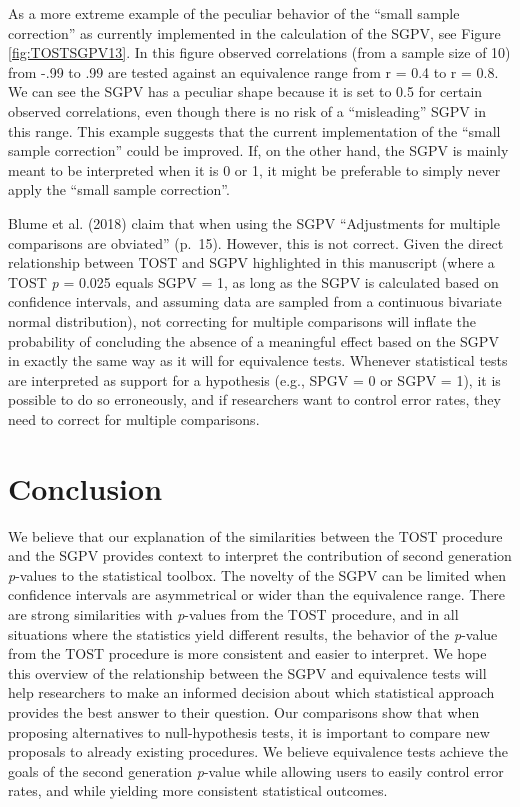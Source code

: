 \documentclass[,man,floatsintext]{apa6}
\begin{document}
As a more extreme example of the peculiar behavior of the \enquote{small sample correction} as currently implemented in the calculation of the SGPV, see Figure \ref{fig:TOSTSGPV13}. In this figure observed correlations (from a sample size of 10) from -.99 to .99 are tested against an equivalence range from r = 0.4 to r = 0.8. We can see the SGPV has a peculiar shape because it is set to 0.5 for certain observed correlations, even though there is no risk of a \enquote{misleading} SGPV in this range. This example suggests that the current implementation of the \enquote{small sample correction} could be improved. If, on the other hand, the SGPV is mainly meant to be interpreted when it is 0 or 1, it might be preferable to simply never apply the \enquote{small sample correction}.

Blume et al. (2018) claim that when using the SGPV \enquote{Adjustments for multiple comparisons are obviated} (p.~15). However, this is not correct. Given the direct relationship between TOST and SGPV highlighted in this manuscript (where a TOST \emph{p} = 0.025 equals SGPV = 1, as long as the SGPV is calculated based on confidence intervals, and assuming data are sampled from a continuous bivariate normal distribution), not correcting for multiple comparisons will inflate the probability of concluding the absence of a meaningful effect based on the SGPV in exactly the same way as it will for equivalence tests. Whenever statistical tests are interpreted as support for a hypothesis (e.g., SPGV = 0 or SGPV = 1), it is possible to do so erroneously, and if researchers want to control error rates, they need to correct for multiple comparisons.

\hypertarget{conclusion}{%
\section{Conclusion}\label{conclusion}}

We believe that our explanation of the similarities between the TOST procedure and the SGPV provides context to interpret the contribution of second generation \emph{p}-values to the statistical toolbox. The novelty of the SGPV can be limited when confidence intervals are asymmetrical or wider than the equivalence range. There are strong similarities with \emph{p}-values from the TOST procedure, and in all situations where the statistics yield different results, the behavior of the \emph{p}-value from the TOST procedure is more consistent and easier to interpret. We hope this overview of the relationship between the SGPV and equivalence tests will help researchers to make an informed decision about which statistical approach provides the best answer to their question. Our comparisons show that when proposing alternatives to null-hypothesis tests, it is important to compare new proposals to already existing procedures. We believe equivalence tests achieve the goals of the second generation \emph{p}-value while allowing users to easily control error rates, and while yielding more consistent statistical outcomes.
\end{document}
